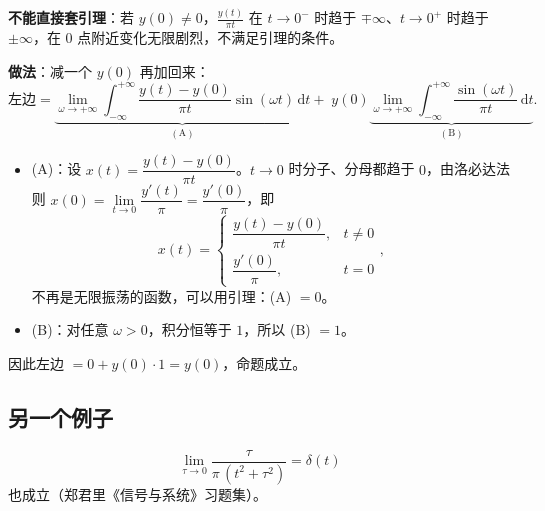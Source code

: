 \documentclass[UTF8,a4paper,11pt]{ctexart}
\newcounter{ex}[section]
\begin{document}
\textbf{不能直接套引理}：若 $y(0)\ne0$，$\frac{y(t)}{\pi t}$ 在 $t\to0^-$ 时趋于 $\mp\infty$、$t\to0^+$ 时趋于 $\pm\infty$，在 $0$ 点附近变化无限剧烈，不满足引理的条件。

\textbf{做法}：减一个 $y(0)$ 再加回来：
\[
\text{左边}=\underbrace{\lim_{\omega\to+\infty}\int_{-\infty}^{+\infty}\frac{y(t)-y(0)}{\pi t}\sin(\omega t)\,\mathrm{d}t}_{(\text{A})}
+\;y(0)\underbrace{\lim_{\omega\to+\infty}\int_{-\infty}^{+\infty}\frac{\sin(\omega t)}{\pi t}\,\mathrm{d}t}_{(\text{B})}.
\]
\begin{itemize}[nosep]
\item (A)：设 $x(t)=\dfrac{y(t)-y(0)}{\pi t}$。$t\to0$ 时分子、分母都趋于 $0$，由洛必达法则 $x(0)=\lim\limits_{t\to0}\dfrac{y'(t)}{\pi}=\dfrac{y'(0)}{\pi}$，即
\[
x(t)=\begin{cases}\dfrac{y(t)-y(0)}{\pi t},&t\ne0\\[6pt]\dfrac{y'(0)}{\pi},&t=0\end{cases},
\]
不再是无限振荡的函数，可以用引理：(A) $=0$。
\item (B)：对任意 $\omega>0$，积分恒等于 $1$，所以 (B) $=1$。
\end{itemize}
因此左边 $=0+y(0)\cdot1=y(0)$，命题成立。

\subsection{另一个例子}
\[
\lim_{\tau\to0}\frac{\tau}{\pi\,(t^2+\tau^2)}=\delta(t)
\]
也成立（郑君里《信号与系统》习题集）。
\end{document}
